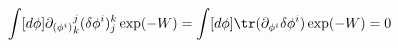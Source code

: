 \begin{equation}
 \int [d\phi]  {\partial_ {(\phi^i)}}^j_k (\delta\phi^i)_j^k \exp( -W)
=\int [d\phi]  \tr( \partial_ {\phi^i} \delta\phi^i) \exp( -W) =  0
\end{equation}

